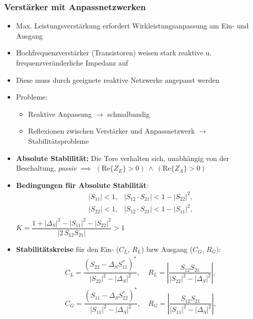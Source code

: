 {\subsubsection{Verstärker mit Anpassnetzwerken}
\begin{itemize}
    \itemsep0pt
    \item Max. Leistungsverstärkung erfordert Wirkleistungsanpassung am Ein- und Ausgang
    \item Hochfrequenzverstärker (Transistoren) weisen stark reaktive u. frequenzveränderliche Impedanz auf
    \item Diese muss durch geeignete reaktive Netzwerke angepasst werden
    \item Probleme:
        \begin{itemize}
            \itemsep0pt
            \item Reaktive Anpassung $\to$ schmalbandig
            \item Reflexionen zwischen Verstärker und Anpassnetzwerk $\to$ Stabilitätsprobleme
        \end{itemize}
    \item \textbf{Absolute Stablilität:} Die Tore verhalten sich, unabhängig von der Beschaltung, \textit{passiv} $\implies$ \(\left(\mathrm{Re}\{Z_E\} > 0\right) \:\wedge\: \left(\mathrm{Re}\{Z_A\} > 0\right)\)
    \item \textbf{Bedingungen für Absolute Stabilität}:
    \begin{align*}
        &|S_{11}| < 1, &|S_{12} \cdot S_{21}| < 1 - |S_{22}|^2,\\
        &|S_{22}| < 1, &|S_{12} \cdot S_{21}| < 1 - |S_{11}|^2,\\
    \end{align*}
        \(K = \dfrac{1 + |\Delta_S|^2 - |S_{11}|^2 - |S_{22}|^2}{|2\, S_{12} S_{21}|} > 1\)
    \item \textbf{Stabilitätskreise} für den Ein- ($C_L$, $R_L$) bzw Ausgang ($C_G$, $R_G$):
        \begin{align*}
            &C_L = \dfrac{\left(S_{22} - \Delta_S S_{11}^*\right)^*}{|S_{22}|^2 - |\Delta_S|^2},\
            &R_L = \left|\dfrac{S_{12} S_{21}}{|S_{22}|^2 - |\Delta_S|^2}\right|,\\
            &C_G = \dfrac{\left(S_{11} - \Delta_S S_{22}^*\right)^*}{|S_{11}|^2 - |\Delta_S|^2},\
            &R_G = \left|\dfrac{S_{12} S_{21}}{|S_{11}|^2 - |\Delta_S|^2}\right|,
        \end{align*}
\end{itemize}
}
